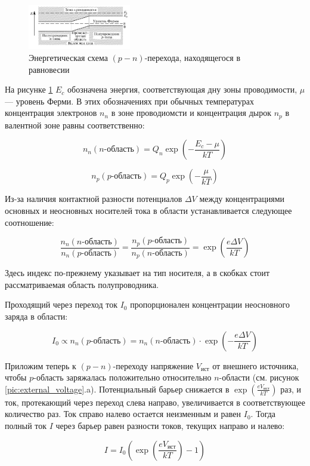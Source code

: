 \documentclass[12pt]{kiarticle}
\begin{document}
	\begin{figure}[h]
		\centering	
		\includegraphics[width=0.4\textwidth]{energy_scheme.png}
		\caption{Энергетическая схема $(p-n)$-перехода, находящегося в равновесии}
		\label{pic:energy_scheme}
	\end{figure}  
	
	На рисунке \ref{pic:energy_scheme} $E_c$ обозначена энергия, соответствующая дну зоны проводимости, $\mu$ --- уровень Ферми. В этих обозначениях при обычных температурах концентрация электронов $n_n$ в зоне проводиомсти и концентрация дырок $n_p$ в валентной зоне равны соответственно: 
	
	\[ n_n(n\text{-область}) = Q_n\exp\left(-\frac{E_c - \mu}{kT}\right) \]
	
	\[ n_p(p\text{-область}) = Q_p\exp\left(-\frac{\mu}{kT}\right) \]
	
	Из-за наличия контактной разности потенциалов $\Delta V$ между концентрациями основных и неосновных носителей тока в области устанавливается следующее соотношение:
	
	\[ \frac{n_n(n\text{-область})}{n_n(p\text{-область})} = \frac{n_p(p\text{-область})}{n_p(n\text{-область})} = \exp{\left(\frac{e\Delta V}{kT}\right)} \]
	
	Здесь индекс по-прежнему указывает на тип носителя, а в скобках стоит рассматриваемая область полупроводника.
	
	Проходящий через переход ток $I_0$ пропорционален концентрации неосновного заряда в области: 
	
	\[ I_0 \propto n_n(p\text{-область}) = n_n(n\text{-область}) \cdot \exp{\left(-\frac{e\Delta V}{kT}\right)} \]
	
	Приложим теперь к $(p-n)$-переходу напряжение $V_\text{ист}$ от внешнего источника, чтобы $p$-область заряжалась положительно относительно $n$-области (см. рисунок \ref{pic:external_voltage}.a). Потенциальный барьер снижается в $\exp{\left(\frac{eV_\text{ист}}{kT}\right)}$ раз, и ток, протекающий через переход слева направо, увеличивается в соответствующее количество раз. Ток справо налево остается неизменным и равен $I_0$. Тогда полный ток $I$ через барьер равен разности токов, текущих направо и налево: 
	
	\[ I = I_0\left(\exp\left(\frac{eV_\text{ист}}{kT}\right) - 1\right) \]
	
\end{document}
